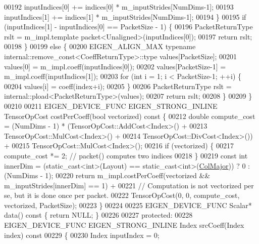 \begin{DoxyCode}
00192       inputIndices[0] += indices[0] * m\_inputStrides[NumDims-1];
00193       inputIndices[1] += indices[1] * m\_inputStrides[NumDims-1];
00194     \}
00195     \textcolor{keywordflow}{if} (inputIndices[1] - inputIndices[0] == PacketSize - 1) \{
00196       PacketReturnType rslt = m\_impl.template packet<Unaligned>(inputIndices[0]);
00197       \textcolor{keywordflow}{return} rslt;
00198     \}
00199     \textcolor{keywordflow}{else} \{
00200       EIGEN\_ALIGN\_MAX \textcolor{keyword}{typename} internal::remove\_const<CoeffReturnType>::type values[PacketSize];
00201       values[0] = m\_impl.coeff(inputIndices[0]);
00202       values[PacketSize-1] = m\_impl.coeff(inputIndices[1]);
00203       \textcolor{keywordflow}{for} (\textcolor{keywordtype}{int} i = 1; i < PacketSize-1; ++i) \{
00204         values[i] = coeff(index+i);
00205       \}
00206       PacketReturnType rslt = internal::pload<PacketReturnType>(values);
00207       \textcolor{keywordflow}{return} rslt;
00208     \}
00209   \}
00210 
00211   EIGEN\_DEVICE\_FUNC EIGEN\_STRONG\_INLINE TensorOpCost costPerCoeff(\textcolor{keywordtype}{bool} vectorized)\textcolor{keyword}{ const }\{
00212     \textcolor{keywordtype}{double} compute\_cost = (NumDims - 1) * (TensorOpCost::AddCost<Index>() +
00213                                            TensorOpCost::MulCost<Index>() +
00214                                            TensorOpCost::DivCost<Index>()) +
00215         TensorOpCost::MulCost<Index>();
00216     \textcolor{keywordflow}{if} (vectorized) \{
00217       compute\_cost *= 2;  \textcolor{comment}{// packet() computes two indices}
00218     \}
00219     \textcolor{keyword}{const} \textcolor{keywordtype}{int} innerDim = (\textcolor{keyword}{static\_cast<}\textcolor{keywordtype}{int}\textcolor{keyword}{>}(Layout) == static\_cast<int>(\hyperlink{group__enums_ggaacded1a18ae58b0f554751f6cdf9eb13a0cbd4bdd0abcfc0224c5fcb5e4f6669a}{ColMajor})) ? 0 : (NumDims - 
      1);
00220     \textcolor{keywordflow}{return} m\_impl.costPerCoeff(vectorized && m\_inputStrides[innerDim] == 1) +
00221         \textcolor{comment}{// Computation is not vectorized per se, but it is done once per packet.}
00222         TensorOpCost(0, 0, compute\_cost, vectorized, PacketSize);
00223   \}
00224 
00225   EIGEN\_DEVICE\_FUNC Scalar* data()\textcolor{keyword}{ const }\{ \textcolor{keywordflow}{return} NULL; \}
00226 
00227  \textcolor{keyword}{protected}:
00228   EIGEN\_DEVICE\_FUNC EIGEN\_STRONG\_INLINE Index srcCoeff(Index index)\textcolor{keyword}{ const}
00229 \textcolor{keyword}{  }\{
00230     Index inputIndex = 0;

\end{DoxyCode}
